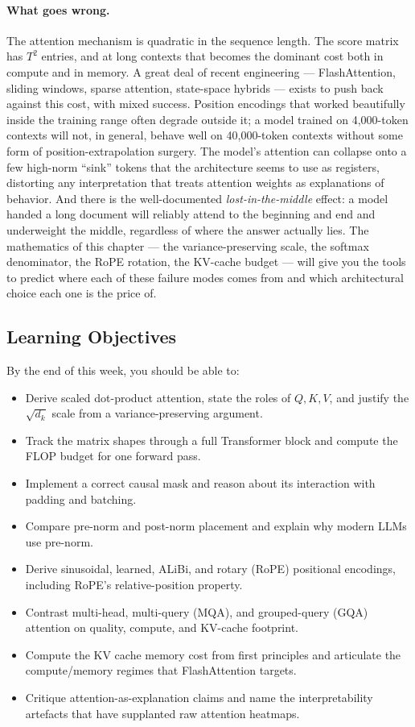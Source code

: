 \paragraph{What goes wrong.}
The attention mechanism is quadratic in the sequence length. The
score matrix has $T^2$ entries, and at long contexts that becomes
the dominant cost both in compute and in memory. A great deal of
recent engineering --- FlashAttention, sliding windows, sparse
attention, state-space hybrids --- exists to push back against this
cost, with mixed success. Position encodings that worked beautifully
inside the training range often degrade outside it; a model trained
on 4{,}000-token contexts will not, in general, behave well on
40{,}000-token contexts without some form of position-extrapolation
surgery. The model's attention can collapse onto a few high-norm
``sink'' tokens that the architecture seems to use as registers,
distorting any interpretation that treats attention weights as
explanations of behavior. And there is the well-documented
\emph{lost-in-the-middle} effect: a model handed a long document
will reliably attend to the beginning and end and underweight the
middle, regardless of where the answer actually lies. The
mathematics of this chapter --- the variance-preserving scale, the
softmax denominator, the RoPE rotation, the KV-cache budget ---
will give you the tools to predict where each of these failure modes
comes from and which architectural choice each one is the price of.

\subsection{Learning Objectives}

By the end of this week, you should be able to:
\begin{itemize}
  \item Derive scaled dot-product attention, state the roles of
        $Q, K, V$, and justify the $\sqrt{d_k}$ scale from a
        variance-preserving argument.
  \item Track the matrix shapes through a full Transformer block and
        compute the FLOP budget for one forward pass.
  \item Implement a correct causal mask and reason about its
        interaction with padding and batching.
  \item Compare pre-norm and post-norm placement and explain why
        modern LLMs use pre-norm.
  \item Derive sinusoidal, learned, ALiBi, and rotary (RoPE)
        positional encodings, including RoPE's relative-position
        property.
  \item Contrast multi-head, multi-query (MQA), and grouped-query
        (GQA) attention on quality, compute, and KV-cache footprint.
  \item Compute the KV cache memory cost from first principles and
        articulate the compute/memory regimes that FlashAttention
        targets.
  \item Critique attention-as-explanation claims and name the
        interpretability artefacts that have supplanted raw attention
        heatmaps.
\end{itemize}

